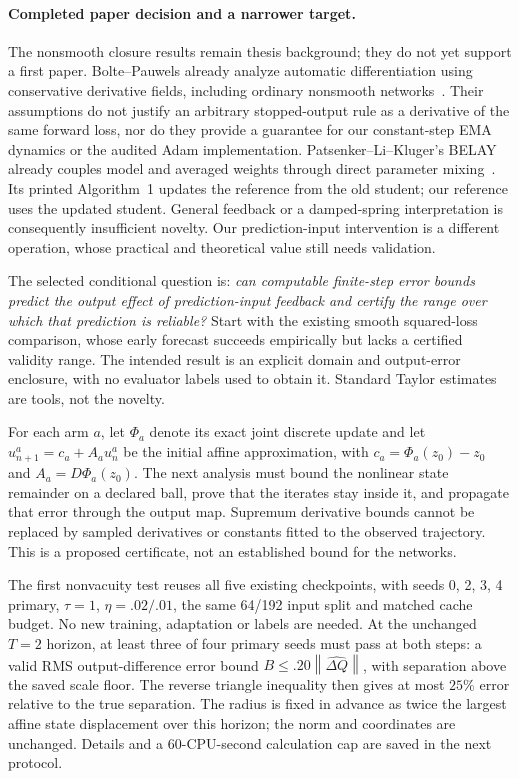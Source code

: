 \documentclass[11pt,a4paper]{article}
\newcommand{\norm}[1]{\left\lVert #1\right\rVert}
\begin{document}
\paragraph{Completed paper decision and a narrower target.}
The nonsmooth closure results remain thesis background; they do not yet
support a first paper. Bolte--Pauwels already analyze automatic
differentiation using conservative derivative fields, including ordinary
nonsmooth networks~\cite{boltepauwels}. Their assumptions do not justify
an arbitrary stopped-output rule as a derivative of the same forward loss,
nor do they provide a guarantee for our constant-step EMA dynamics or
the audited Adam implementation.
Patsenker--Li--Kluger's BELAY already couples model and averaged weights
through direct parameter mixing~\cite{belay}. Its printed Algorithm~1
updates the reference from the old student; our reference uses the updated
student. General feedback or a damped-spring interpretation is consequently
insufficient novelty. Our prediction-input intervention is a different
operation, whose practical and theoretical value still needs validation.

The selected conditional question is: \emph{can computable finite-step
error bounds predict the output effect of prediction-input feedback and
certify the range over which that prediction is reliable?} Start with the
existing smooth squared-loss comparison, whose early forecast succeeds
empirically but lacks a certified validity range. The intended result is
an explicit domain and output-error enclosure, with no evaluator labels
used to obtain it. Standard Taylor estimates are tools, not the novelty.

For each arm $a$, let $\Phi_a$ denote its exact joint discrete update and
let $u^a_{n+1}=c_a+A_a u^a_n$ be the initial affine approximation, with
$c_a=\Phi_a(z_0)-z_0$ and $A_a=D\Phi_a(z_0)$.
The next analysis must bound the nonlinear state remainder on a declared
ball, prove that the iterates stay inside it, and propagate that error
through the output map. Supremum derivative bounds cannot be replaced by
sampled derivatives or constants fitted to the observed trajectory.
This is a proposed certificate, not an established bound for the networks.

The first nonvacuity test reuses all five existing checkpoints, with
seeds 0, 2, 3, 4 primary, $\tau=1$, $\eta=.02/.01$, the same 64/192
input split and matched cache budget. No new training, adaptation or labels
are needed. At the unchanged $T=2$ horizon, at least three of four primary
seeds must pass at both steps: a valid RMS output-difference error bound
$B\le .20\norm{\widehat{\Delta Q}}$, with separation above the saved
scale floor. The reverse triangle inequality then gives at most $25\%$
error relative to the true separation. The radius is fixed in advance as
twice the largest affine state displacement over this horizon; the norm
and coordinates are unchanged. Details and a 60-CPU-second calculation
cap are saved in the next protocol.
\end{document}
